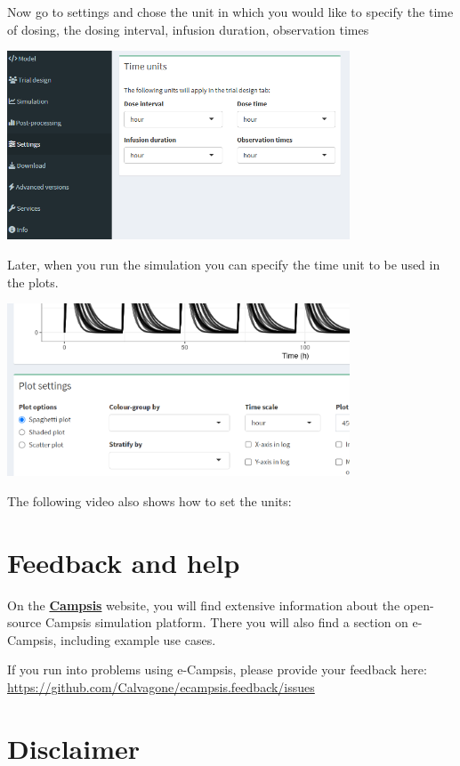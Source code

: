 \documentclass[
]{book}
\begin{document}
Now go to settings and chose the unit in which you would like to specify the time of dosing, the dosing interval, infusion duration, observation times

\includegraphics[width=4.01042in,height=\textheight]{pictures/time-units.png}

Later, when you run the simulation you can specify the time unit to be used in the plots.

\includegraphics[width=4.01042in,height=\textheight]{pictures/time-units-plot.png}

The following video also shows how to set the units:

\chapter{Feedback and help}\label{feedback-and-help}

On the \href{https://calvagone.github.io/}{\textbf{Campsis}} website, you will find extensive information about the open-source Campsis simulation platform. There you will also find a section on e-Campsis, including example use cases.

If you run into problems using e-Campsis, please provide your feedback here: \url{https://github.com/Calvagone/ecampsis.feedback/issues}

\chapter{Disclaimer}\label{disclaimer}
\end{document}
